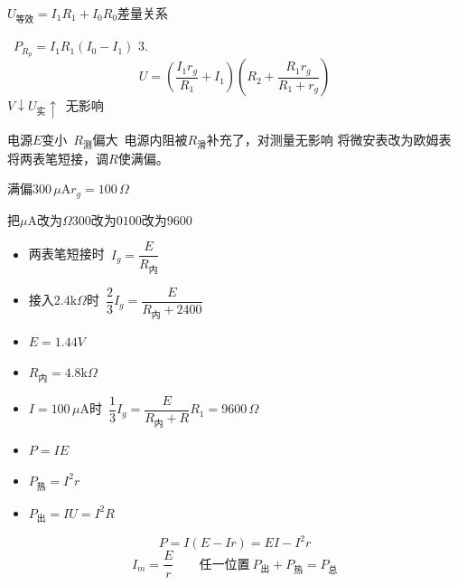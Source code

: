 $U_{\text{等效}}=I_1R_1+I_0R_0$\qquad 差量关系

\ $P_{R_p}=I_1R_1(I_0-I_1)$ %
3.
\[
U=\left(\frac{I_1r_g}{R_1}+I_1\right)\left(R_2+\frac{R_1r_g}{R_1+r_g}\right)
\]
\quad $V\downarrow$\qquad $U_{\text{实}}\uparrow$\ 无影响 %

电源$E$变小\ $R_{\text{测}}$偏大\ 电源内阻被$R_{\text{滑}}$补充了，对测量无影响
将微安表改为欧姆表\quad 将两表笔短接，调$R$使满偏。

满偏$300\,\mu$A\quad $r_g=100\,\Omega$


把$\mu$A改为$\Omega$\quad $300$改为$0$\quad $100$改为$9600$

\begin{itemize}
\item 两表笔短接时\ $I_g=\dfrac{E}{R_{\text{内}}}$
\item 接入$2.4\mathrm{k}\Omega$时\ $\dfrac{2}{3}I_g=\dfrac{E}{R_{\text{内}}+2400}$
\item $E=1.44\unit{V}$
\item $R_{\text{内}}=4.8\mathrm{k}\Omega$
\item $I=100\,\mu$A时\ $\dfrac{1}{3}I_g=\dfrac{E}{R_{\text{内}}+R}$\quad $R_1=9600\,\Omega$ %
\end{itemize}
\begin{itemize}
\item $P=IE$
\item $P_{\text{热}}=I^2r$
\item $P_{\text{出}}=IU=I^2R$
\end{itemize}


\[
P=I(E-Ir)=EI-I^2r
\]
\[
I_m=\frac{E}{r}\qquad\text{任一位置}\ P_{\text{出}}+P_{\text{热}}=P_{\text{总}}
\]

